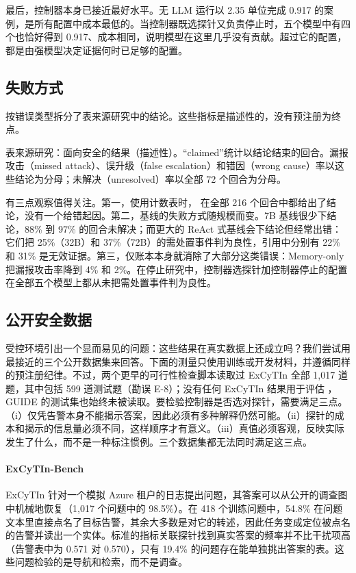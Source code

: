 最后，控制器本身已接近最好水平。无 LLM 运行以 2.35 单位完成 0.917 的案例，是所有配置中成本最低的。当控制器既选探针又负责停止时，五个模型中有四个也恰好得到 0.917、成本相同，说明模型在这里几乎没有贡献。超过它的配置，都是由强模型决定证据何时已足够的配置。

\subsection{失败方式}
\label{sec:security}
 按错误类型拆分了表来源研究中的结论。这些指标是描述性的，没有预注册为终点。

\begin{table}[t]
  \caption{表来源研究：面向安全的结果（描述性）。“claimed”统计以结论结束的回合。漏报攻击（missed attack）、误升级（false escalation）和错因（wrong cause）率以这些结论为分母；未解决（unresolved）率以全部 72 个回合为分母。}
  \label{tab:security}
  \centering\small
  \begin{adjustbox}{max width=\textwidth}\end{adjustbox}
\end{table}

有三点观察值得关注。第一，使用计数表时，\hesp{} 在全部 216 个回合中都给出了结论，没有一个给错起因。第二，基线的失败方式随规模而变。7B 基线很少下结论，88\% 到 97\% 的回合未解决；而更大的 ReAct 式基线会下结论但经常出错：它们把 25\%（32B）和 37\%（72B）的需处置事件判为良性，引用中分别有 22\% 和 31\% 是无效证据。第三，仅账本本身就消除了大部分这类错误：Memory-only 把漏报攻击率降到 4\% 和 2\%。在停止研究中，控制器选探针加控制器停止的配置在全部五个模型上都从未把需处置事件判为良性。

\subsection{公开安全数据}
\label{sec:realdata}
受控环境引出一个显而易见的问题：这些结果在真实数据上还成立吗？我们尝试用最接近的三个公开数据集来回答。下面的测量只使用训练或开发材料，并遵循同样的预注册纪律。不过，两个更早的可行性检查脚本读取过 ExCyTIn 全部 1{,}017 道题，其中包括 599 道测试题（勘误 E-8）；没有任何 ExCyTIn 结果用于评估 \hesp{}，GUIDE 的测试集也始终未被读取。要检验控制器是否选对探针，需要满足三点。（i）仅凭告警本身不能揭示答案，因此必须有多种解释仍然可能。（ii）探针的成本和揭示的信息量必须不同，这样顺序才有意义。（iii）真值必须客观，反映实际发生了什么，而不是一种标注惯例。三个数据集都无法同时满足这三点。

\paragraph{ExCyTIn-Bench~\citep{excytin}} ExCyTIn 针对一个模拟 Azure 租户的日志提出问题，其答案可以从公开的调查图中机械地恢复（1{,}017 个问题中的 98.5\%）。在 418 个训练问题中，54.8\% 在问题文本里直接点名了目标告警，其余大多数是对它的转述，因此任务变成定位被点名的告警并读出一个实体。标准的指标关联探针找到真实答案的频率并不比干扰项高（告警表中为 0.571 对 0.570），只有 19.4\% 的问题存在能单独挑出答案的表。这些问题检验的是导航和检索，而不是调查。

